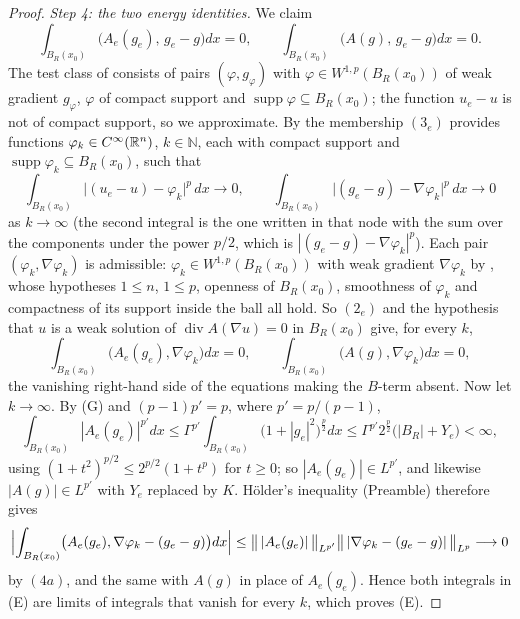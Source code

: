 \begin{proof}
\emph{Step 4: the two energy identities.}  We claim
\[
\int_{B_R(x_0)}\bigl(A_e(g_e),\,g_e-g\bigr)dx=0,
\qquad
\int_{B_R(x_0)}\bigl(A(g),\,g_e-g\bigr)dx=0 .
\tag{E}
\]
The test class of  consists of pairs $(\varphi,g_\varphi)$
with $\varphi\in W^{1,p}(B_R(x_0))$ of weak gradient $g_\varphi$, $\varphi$ of
compact support and $\operatorname{supp}\varphi\subseteq B_R(x_0)$; the function
$u_e-u$ is not of compact support, so we approximate.  By
 the membership $(3_e)$ provides functions
$\varphi_k\in C^\infty(\mathbb{R}^n)$, $k\in\mathbb{N}$, each with compact support and
$\operatorname{supp}\varphi_k\subseteq B_R(x_0)$, such that
\[
\int_{B_R(x_0)}\bigl|(u_e-u)-\varphi_k\bigr|^p\,dx\to0,
\qquad
\int_{B_R(x_0)}\bigl|(g_e-g)-\nabla\varphi_k\bigr|^p\,dx\to0
\tag{4a}
\]
as $k\to\infty$ (the second integral is the one written in that node with the
sum over the components under the power $p/2$, which is
$|(g_e-g)-\nabla\varphi_k|^p$).  Each pair $(\varphi_k,\nabla\varphi_k)$ is
admissible: $\varphi_k\in W^{1,p}(B_R(x_0))$ with weak gradient
$\nabla\varphi_k$ by , whose hypotheses
$1\le n$, $1\le p$, openness of $B_R(x_0)$, smoothness of $\varphi_k$ and
compactness of its support inside the ball all hold.  So $(2_e)$ and the
hypothesis that $u$ is a weak solution of $\operatorname{div}A(\nabla u)=0$ in
$B_R(x_0)$ give, for every $k$,
\[
\int_{B_R(x_0)}\bigl(A_e(g_e),\nabla\varphi_k\bigr)dx=0,
\qquad
\int_{B_R(x_0)}\bigl(A(g),\nabla\varphi_k\bigr)dx=0 ,
\]
the vanishing right-hand side of the equations making the $B$-term absent.
Now let $k\to\infty$.  By (G) and $(p-1)p'=p$, where $p'=p/(p-1)$,
\[
\int_{B_R(x_0)}|A_e(g_e)|^{p'}dx
\le\Gamma^{p'}\int_{B_R(x_0)}\bigl(1+|g_e|^2\bigr)^{\frac p2}dx
\le\Gamma^{p'}2^{\frac p2}\bigl(|B_R|+Y_e\bigr)<\infty ,
\]
using $(1+t^2)^{p/2}\le2^{p/2}(1+t^p)$ for $t\ge0$; so $|A_e(g_e)|\in L^{p'}$,
and likewise $|A(g)|\in L^{p'}$ with $Y_e$ replaced by $K$.  Hölder's
inequality (Preamble) therefore gives
\[
\Bigl|\int_{B_R(x_0)}\bigl(A_e(g_e),\nabla\varphi_k-(g_e-g)\bigr)dx\Bigr|
\le\bigl\|\,|A_e(g_e)|\,\bigr\|_{L^{p'}}
\bigl\|\,|\nabla\varphi_k-(g_e-g)|\,\bigr\|_{L^{p}}\longrightarrow0
\]
by $(4a)$, and the same with $A(g)$ in place of $A_e(g_e)$.  Hence both
integrals in (E) are limits of integrals that vanish for every $k$, which proves
(E).


\end{proof}
